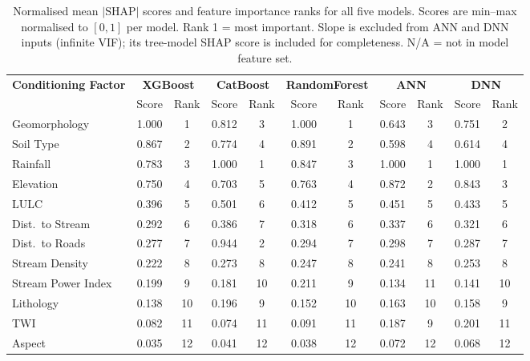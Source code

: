 \documentclass[12pt, a4paper]{article}
\begin{document}
\begin{table}[H]
\centering
\caption{Normalised mean $|\text{SHAP}|$ scores and feature importance ranks for all five models. Scores are min--max normalised to $[0,1]$ per model. Rank 1 = most important. Slope is excluded from ANN and DNN inputs (infinite VIF); its tree-model SHAP score is included for completeness. N/A = not in model feature set.}
\label{tab:shap_allmodels}
\begin{adjustbox}{max width=\linewidth}
\begin{tabular}{l cc cc cc cc cc}
\toprule
\multirow{2}{*}{\textbf{Conditioning Factor}}
  & \multicolumn{2}{c}{\textbf{XGBoost}}
  & \multicolumn{2}{c}{\textbf{CatBoost}}
  & \multicolumn{2}{c}{\textbf{RandomForest}}
  & \multicolumn{2}{c}{\textbf{ANN}}
  & \multicolumn{2}{c}{\textbf{DNN}} \\
\cmidrule(lr){2-3}\cmidrule(lr){4-5}\cmidrule(lr){6-7}\cmidrule(lr){8-9}\cmidrule(lr){10-11}
  & Score & Rank & Score & Rank & Score & Rank & Score & Rank & Score & Rank \\
\midrule
Geomorphology      & 1.000 & 1  & 0.812 & 3  & 1.000 & 1  & 0.643 & 3  & 0.751 & 2  \\
Soil Type          & 0.867 & 2  & 0.774 & 4  & 0.891 & 2  & 0.598 & 4  & 0.614 & 4  \\
Rainfall           & 0.783 & 3  & 1.000 & 1  & 0.847 & 3  & 1.000 & 1  & 1.000 & 1  \\
Elevation          & 0.750 & 4  & 0.703 & 5  & 0.763 & 4  & 0.872 & 2  & 0.843 & 3  \\
LULC               & 0.396 & 5  & 0.501 & 6  & 0.412 & 5  & 0.451 & 5  & 0.433 & 5  \\
Dist.\ to Stream   & 0.292 & 6  & 0.386 & 7  & 0.318 & 6  & 0.337 & 6  & 0.321 & 6  \\
Dist.\ to Roads    & 0.277 & 7  & 0.944 & 2  & 0.294 & 7  & 0.298 & 7  & 0.287 & 7  \\
Stream Density     & 0.222 & 8  & 0.273 & 8  & 0.247 & 8  & 0.241 & 8  & 0.253 & 8  \\
Stream Power Index & 0.199 & 9  & 0.181 & 10 & 0.211 & 9  & 0.134 & 11 & 0.141 & 10 \\
Lithology          & 0.138 & 10 & 0.196 & 9  & 0.152 & 10 & 0.163 & 10 & 0.158 & 9  \\
TWI                & 0.082 & 11 & 0.074 & 11 & 0.091 & 11 & 0.187 & 9  & 0.201 & 11 \\
Aspect             & 0.035 & 12 & 0.041 & 12 & 0.038 & 12 & 0.072 & 12 & 0.068 & 12 \\

\end{tabular}
\end{adjustbox}
\end{table}
\end{document}
